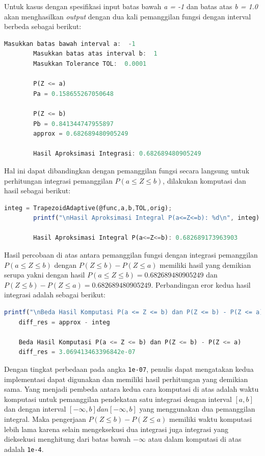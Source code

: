 \documentclass[journal,12pt,onecolumn,a4paper]{IEEEtran}
\begin{document}
Untuk kasus dengan spesifikasi input batas bawah \emph{a = -1} dan batas atas \emph{b = 1.0} akan menghasilkan \emph{output} dengan dua kali pemanggilan fungsi dengan interval berbeda sebagai berikut:

\begin{center}
	\begin{lstlisting}[language=Octave]
		Masukkan batas bawah interval a:  -1
		Masukkan batas atas interval b:  1
		Masukkan Tolerance TOL:  0.0001

		P(Z <= a)
		Pa = 0.158655267050648

		P(Z <= b)
		Pb = 0.841344747955897
		approx = 0.682689480905249

		Hasil Aproksimasi Integrasi: 0.682689480905249

	\end{lstlisting}
\end{center}

Hal ini dapat dibandingkan dengan pemanggilan fungsi secara langsung untuk perhitungan integrasi pemanggilan \(P(a \le Z \le b)\), dilakukan komputasi dan hasil sebagai berikut:
\begin{center}
	\begin{lstlisting}[language=Octave]
		integ = TrapezoidAdaptive(@func,a,b,TOL,orig);
		printf("\nHasil Aproksimasi Integral P(a<=Z<=b): %d\n", integ)

		Hasil Aproksimasi Integral P(a<=Z<=b): 0.682689173963903
	\end{lstlisting}
\end{center}

Hasil percobaan di atas antara pemanggilan fungsi dengan integrasi pemanggilan \(P(a \le Z \le b)\) dengan \(P(Z \le b ) - P(Z \le a )\) memiliki hasil yang demikian serupa yakni dengan hasil \(P(a \le Z \le b)= 0.682689480905249\)  dan \(P(Z \le b ) - P(Z \le a ) = 0.682689480905249\). Perbandingan eror kedua hasil integrasi adalah sebagai berikut:

\begin{center}
	\begin{lstlisting}[language=Octave]
	printf("\nBeda Hasil Komputasi P(a <= Z <= b) dan P(Z <= b) - P(Z <= a)\n")
	diff_res = approx - integ

	Beda Hasil Komputasi P(a <= Z <= b) dan P(Z <= b) - P(Z <= a)
	diff_res = 3.069413463396842e-07
	\end{lstlisting}
\end{center}

Dengan tingkat perbedaan pada angka \lstinline{1e-07}, penulis dapat mengatakan kedua implementasi dapat digunakan dan memiliki hasil perhitungan yang demikian sama. Yang menjadi pembeda antara kedua cara komputasi di atas adalah waktu komputasi untuk pemanggilan pendekatan satu integrasi dengan interval \([a,b]\) dan dengan interval \([-\infty,b] dan [-\infty,b]\) yang menggunakan dua pemanggilan integral. Maka pengerjaan \(P(Z \le b ) - P(Z \le a )\) memiliki waktu komputasi lebih lama karena selain mengeksekusi dua integrasi juga integrasi yang dieksekusi menghitung dari batas bawah \(-\infty\) atau dalam komputasi di atas adalah \lstinline{1e-4}.
\end{document}
